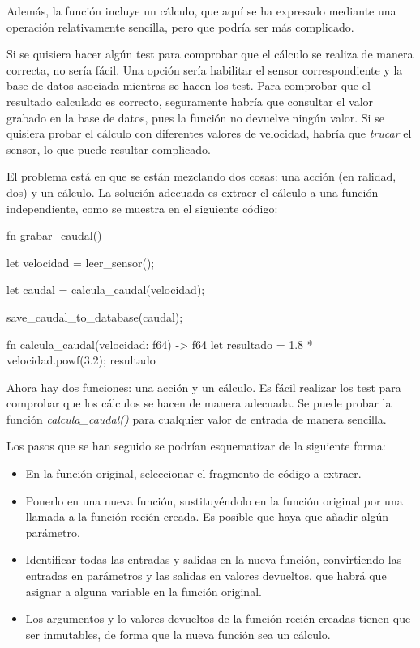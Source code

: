 Además, la función incluye un cálculo, que aquí se ha expresado mediante una operación relativamente sencilla, pero que podría ser más complicado. 

Si se quisiera hacer algún test para comprobar que el cálculo se realiza de manera correcta, no sería fácil. Una opción sería habilitar el sensor correspondiente y la base de datos asociada mientras se hacen los test. Para comprobar que el resultado calculado es correcto, seguramente habría que consultar el valor grabado en la base de datos, pues la función no devuelve ningún valor. Si se quisiera probar el cálculo con diferentes valores de velocidad, habría que \textit{trucar} el sensor, lo que puede resultar complicado.

El problema está en que se están mezclando dos cosas: una acción (en ralidad, dos) y un cálculo. La solución adecuada es extraer el cálculo a una función independiente, como se muestra en el siguiente código:

\vspace{0.7em}
\begin{Codigo}
fn grabar_caudal() {
   let velocidad = leer_sensor();
   
   let caudal = calcula_caudal(velocidad);
   
   save_caudal_to_database(caudal);
}
fn calcula_caudal(velocidad: f64) -> f64 {
   let resultado = 1.8 * velocidad.powf(3.2);
   resultado
}
\end{Codigo}

Ahora hay dos funciones: una acción y un cálculo. Es fácil realizar los test para comprobar que los cálculos se hacen de manera adecuada. Se puede probar la función \textit{calcula\_caudal()} para cualquier valor de entrada de manera sencilla.

Los pasos que se han seguido se podrían esquematizar de la siguiente forma:
\begin{itemize}
   \item En la función original, seleccionar el fragmento de código a extraer.
   \item Ponerlo en una nueva función, sustituyéndolo en la función original por una llamada a la función recién creada. Es posible que haya que añadir algún parámetro.
   \item Identificar todas las entradas y salidas en la nueva función, convirtiendo las entradas en parámetros y las salidas en valores devueltos, que habrá que asignar a alguna variable en la función original.
   \item Los argumentos y lo valores devueltos de la función recién creadas tienen que ser inmutables, de forma que la nueva función sea un cálculo.
\end{itemize}

